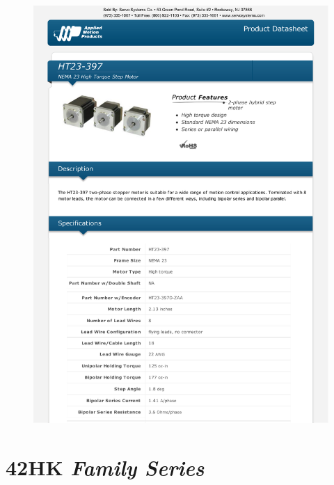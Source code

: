 \begin{figure}[h]   
\begin{centering}
\includegraphics[width=0.81\columnwidth]{datasheets/ht23-397.pdf}
\par\end{centering}

\end{figure}
\newpage

\section{42HK \textit{Family Series}}

\label{42HK}

